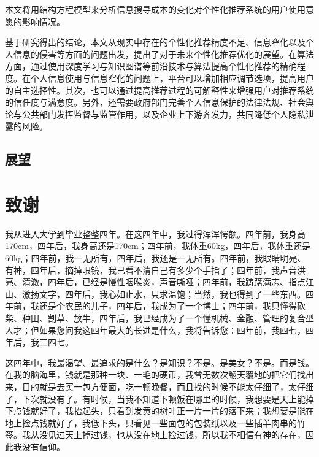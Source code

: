 \documentclass[a4paper,zihao=-4,UTF8]{ctexart}
\numberwithin{equation}{section}
\newcommand{\bold}[2][0.3]{\setBold[#1]#2\unsetBold}
\begin{document}
	本文将用结构方程模型来分析信息搜寻成本的变化对个性化推荐系统的用户使用意愿的影响情况。
	
	基于研究得出的结论，本文从现实中存在的个性化推荐精度不足、信息窄化以及个人信息的侵害等方面的问题出发，提出了对于未来个性化推荐优化的展望。在算法方面，通过使用深度学习与知识图谱等前沿技术与算法提高个性化推荐的精确程度。在个人信息使用与信息窄化的问题上，平台可以增加相应调节选项，提高用户的自主选择性。其次，也可以通过提高推荐过程的可解释性来增强用户对推荐系统的信任度与满意度。另外，还需要政府部门完善个人信息保护的法律法规、社会舆论与公共部门发挥监督与监管作用，以及企业上下游齐发力，共同降低个人隐私泄露的风险。
	\subsection{展望}

\newpage
\fancyhf{}
\renewcommand{\headrulewidth}{0pt}
\cfoot{\footnotesize \thepage }
\printbibliography[heading=bibintoc,title={参考文献}]


\newpage
\section*{致谢}
我从进入大学到毕业整整四年。在这四年中，我过得浑浑愕额。四年前，我身高170cm，四年后，我身高还是170cm；四年前，我体重60kg，四年后，我体重还是60kg；四年前，我一无所有，四年后，我还是一无所有。四年前，我眼睛明亮、有神，四年后，摘掉眼镜，我已看不清自己有多少个手指了；四年前，我声音洪亮、清澈，四年后，已经是慢性咽喉炎，声音嘶哑；四年前，我踌躇满志、指点江山、激扬文字，四年后，我心如止水，只求温饱；当然，我也得到了一些东西。四年前，我还是个农民的儿子，四年后，我成为了一个博士；四年前，我只懂得砍柴、种田、割草、放牛，四年后，我已经成为了一个懂机械、金融、管理的复合型人才；但如果您问我这四年最大的长进是什么，我将告诉您：四年前，我四七，四年后，我二四七。

这四年中，我最渴望、最追求的是什么？是知识？不是。是美女？不是。而是钱。在我的脑海里，钱就是那种一块、一毛的硬币，我曾无数次翻天覆地的把它们找出来，目的就是去买一包方便面，吃一顿晚餐，而且找的时候不能太仔细了，太仔细了，下次就没有了。有时候，当我不知道下顿饭在哪里的时候，我想要是天上能掉下点钱就好了，我抬起头，只看到发黄的树叶正一片一片的落下来；我想要是能在地上捡点钱就好了，我低下头，只看见一些面包的包装纸以及一些插羊肉串的竹签。我从没见过天上掉过钱，也从没在地上捡过钱，所以我不相信有神的存在，因此我没有信仰。
\end{document}
